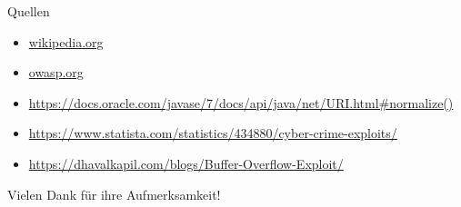 \documentclass[10pt]{beamer}
\begin{document}



\begin{frame}[fragile]{Quellen}
  \begin{itemize}
    \item \url{wikipedia.org}
    \item \url{owasp.org}
    \item \url{https://docs.oracle.com/javase/7/docs/api/java/net/URI.html#normalize()}
    \item \url{https://www.statista.com/statistics/434880/cyber-crime-exploits/}
    \item \url{https://dhavalkapil.com/blogs/Buffer-Overflow-Exploit/}
  \end{itemize}
\end{frame}

\begin{frame}[fragile]{}
  \huge Vielen Dank f\"ur ihre Aufmerksamkeit!
\end{frame}
\end{document}
